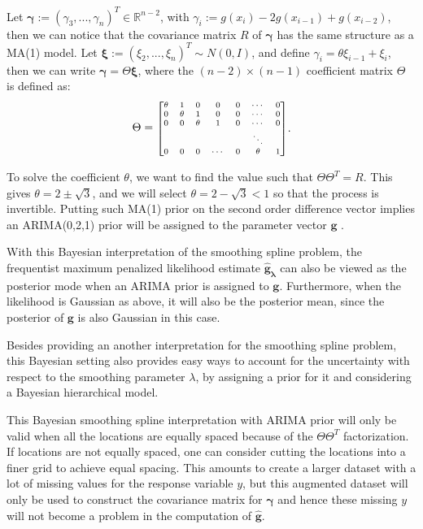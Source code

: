 \documentclass{article}
\begin{document}
Let $\boldsymbol \gamma:=(\gamma_3,...,\gamma_n)^T \in \mathbb{R}^{n-2}$, with $\gamma_i :=g(x_i)-2g(x_{i-1})+g(x_{i-2})$, then we can notice that the covariance matrix $R$ of $\boldsymbol \gamma$ has the same structure as a MA(1) model. Let $\boldsymbol \xi :=(\xi_2,...,\xi_n)^T \sim N(0, I)$, and define $\gamma_i = \theta\xi_{i-1} +\xi_i$, then we can write $\boldsymbol \gamma = \Theta \boldsymbol \xi$, where the $(n-2)\times(n-1)$ coefficient matrix $\Theta$ is defined as:
\begin{equation}
\begin{aligned}
\Theta = \mbox{\scriptsize $\begin{bmatrix}
\theta & 1 & 0 & 0 & 0 & \cdots & 0\\
0 & \theta & 1 & 0 & 0 & \cdots & 0\\
0 & 0 & \theta & 1 & 0 & \cdots & 0\\
 &  &  &  &  & \ddots & \\
0 & 0 & 0 & \cdots & 0 & \theta & 1\\
\end{bmatrix}$}
\end{aligned}.
\end{equation}

To solve the coefficient $\theta$, we want to find the value such that $\Theta\Theta^T=R$. This gives $\theta = 2 \pm \sqrt{3}$, and we will select $\theta=2-\sqrt3 <1$ so that the process is invertible. Putting such MA(1) prior on the second order difference vector implies an ARIMA(0,2,1) prior will be assigned to the parameter vector $\boldsymbol g$ \citep{ARIMA}.

With this Bayesian interpretation of the smoothing spline problem, the frequentist maximum penalized likelihood estimate $\boldsymbol{\hat{g}_\lambda}$ can also be viewed as the posterior mode when an ARIMA prior is assigned to $\boldsymbol g$. Furthermore, when the likelihood is Gaussian as above, it will also be the posterior mean, since the posterior of $\boldsymbol g$ is also Gaussian in this case.

Besides providing an another interpretation for the smoothing spline problem, this Bayesian setting also provides easy ways to account for the uncertainty with respect to the smoothing parameter $\lambda$, by assigning a prior for it and considering a Bayesian hierarchical model. 

This Bayesian smoothing spline interpretation with ARIMA prior will only be valid when all the locations are equally spaced because of the $\Theta\Theta^T$ factorization. If locations are not equally spaced, one can consider cutting the locations into a finer grid to achieve equal spacing. This amounts to create a larger dataset with a lot of missing values for the response variable $y$, but this augmented dataset will only be used to construct the covariance matrix for $\boldsymbol{\gamma}$ and hence these missing $y$ will not become a problem in the computation of $\hat{\boldsymbol{g}}$.
\end{document}
